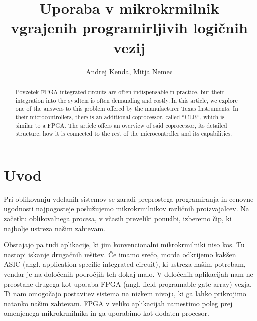 \documentclass[a4paper]{article}
\begin{document}
\begin{sloppypar}
\title{Uporaba v mikrokrmilnik vgrajenih programirljivih logičnih vezij}

\author{Andrej Kenda, Mitja Nemec}



\maketitle



\begin{abstract}{Povzetek}
FPGA integrated circuits are often indispensable in practice, but their
integration into the sysdtem is often demanding and costly. In this article, we
explore one of the answers to this problem offered by the manufacturer Texas
Instruments. In their microcontrollers, there is an additional coprocessor,
called ``CLB'', which is similar to a FPGA. The article offers an overview of
said coprocessor, its detailed structure, how it is connected to the rest of
the microcontroller and its capabilities.
\end{abstract}




\section{Uvod}
Pri oblikovanju vdelanih sistemov se zaradi preprostega programiranja in
cenovne ugodnosti najpogosteje poslužujemo mikrokrmilnikov različnih
proizvajalcev. Na začetku oblikovalnega procesa, v včasih preveliki ponudbi,
izberemo čip, ki najbolje ustreza našim zahtevam.

Obstajajo pa tudi aplikacije, ki jim konvencionalni mikrokrmilniki niso kos. Tu
nastopi iskanje drugačnih rešitev. Če imamo srečo, morda odkrijemo kakšen ASIC
(angl. application specific integrated circuit), ki ustreza našim potrebam,
vendar je na določenih področjih teh dokaj malo. V določenih aplikacijah nam ne
preostane drugega kot uporaba FPGA (angl. field-programable gate array) vezja.
Ti nam omogočajo postavitev sistema na nizkem nivoju, ki ga lahko prikrojimo
natanko našim zahtevam. FPGA v veliko aplikacijah namestimo poleg prej
omenjenega mikrokrmilnika in ga uporabimo kot dodaten procesor.


\end{sloppypar}
\end{document}
